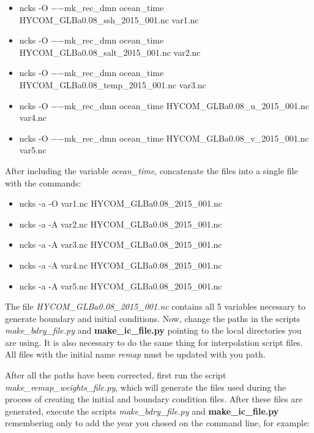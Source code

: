 \begin{itemize}
    \item ncks -O  $-$$-$mk\_rec\_dmn ocean\_time HYCOM\_GLBa0.08\_ssh\_2015\_001.nc  var1.nc
    \item ncks -O $-$$-$mk\_rec\_dmn ocean\_time HYCOM\_GLBa0.08\_salt\_2015\_001.nc  var2.nc
    \item ncks -O $-$$-$mk\_rec\_dmn ocean\_time HYCOM\_GLBa0.08\_temp\_2015\_001.nc  var3.nc    
    \item ncks -O $-$$-$mk\_rec\_dmn ocean\_time HYCOM\_GLBa0.08\_u\_2015\_001.nc  var4.nc
    \item ncks -O $-$$-$mk\_rec\_dmn ocean\_time HYCOM\_GLBa0.08\_v\_2015\_001.nc  var5.nc  
\end{itemize}
\bigskip

\noindent After including the variable \textit{ocean\_time}, concatenate the files into a single file with the commands: 
\bigskip

\begin{itemize}
    \item ncks  -a  -O var1.nc  HYCOM\_GLBa0.08\_2015\_001.nc
    \item ncks  -a  -A var2.nc  HYCOM\_GLBa0.08\_2015\_001.nc
    \item ncks  -a  -A var3.nc  HYCOM\_GLBa0.08\_2015\_001.nc
    \item ncks  -a  -A var4.nc  HYCOM\_GLBa0.08\_2015\_001.nc
    \item ncks  -a  -A var5.nc  HYCOM\_GLBa0.08\_2015\_001.nc
\end{itemize}
\bigskip

The file \textit{HYCOM\_GLBa0.08\_2015\_001.nc} contains all 5 variables necessary to generate boundary and initial conditions.
Now, change the paths in the scripts \textit{make\_bdry\_file.py} and \textbf{make\_ic\_file.py} pointing to the local directories you are using. 
It is also necessary to do the same thing for interpolation script files. All files with the initial name \textit{remap} must be updated with you path.
\bigskip

\noindent After all the paths have been corrected, first run the script \textit{make\_remap\_weights\_file.py}, which will generate the files 
used during the process of creating the initial and boundary condition files. After these files are generated, execute the scripts \textit{make\_bdry\_file.py} and
\textbf{make\_ic\_file.py} remembering only to add the year you chosed on the command line, for example: 
\bigskip

